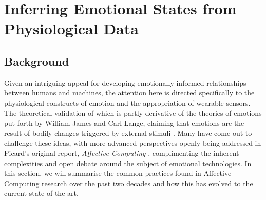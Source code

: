 \section{Inferring Emotional States from Physiological Data}
\label{lit_review:affective_computing}

\subsection*{Background}

 Given an intriguing appeal for developing emotionally-informed relationships between humans and machines, the attention here is directed specifically to the physiological constructs of emotion and the appropriation of wearable sensors. The theoretical validation of which is partly derivative of the theories of emotions put forth by William James and Carl Lange, claiming that emotions are the result of bodily changes triggered by external stimuli \cite{james_principles_1890,cannon_james-lange_1927}. Many have come out to challenge these ideas, with more advanced perspectives openly being addressed in Picard's original report, \textit{Affective Computing} \cite{picard_affective_1995}, complimenting the inherent complexities and open debate around the subject of emotional technologies. In this section, we will summarise the common practices found in Affective Computing research over the past two decades and how this has evolved to the current state-of-the-art.

